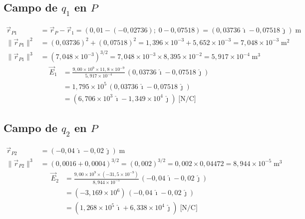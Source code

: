 \documentclass[12pt,letterpaper]{article}
\begin{document}
\subsection*{Campo de $q_1$ en $P$}

\begin{align*}
    \vec{r}_{P1} &= \vec{r}_P-\vec{r}_1
                   = (0{,}01-(-0{,}02736);\;0-0{,}07518)
                   = (0{,}03736\,\hat{\imath}-0{,}07518\,\hat{\jmath})\;\text{m}\\
    \|\vec{r}_{P1}\|^2 &= (0{,}03736)^2+(0{,}07518)^2
                         = 1{,}396\times10^{-3}+5{,}652\times10^{-3} = 7{,}048\times10^{-3}\;\text{m}^2\\
    \|\vec{r}_{P1}\|^3 &= (7{,}048\times10^{-3})^{3/2}
                         = 7{,}048\times10^{-3}\times8{,}395\times10^{-2} = 5{,}917\times10^{-4}\;\text{m}^3
\end{align*}
\begin{align*}
    \vec{E}_1
    &= \frac{9{,}00\times10^9\times11{,}8\times10^{-9}}{5{,}917\times10^{-4}}
       \,(0{,}03736\,\hat{\imath}-0{,}07518\,\hat{\jmath})\\
    &= 1{,}795\times10^5\,(0{,}03736\,\hat{\imath}-0{,}07518\,\hat{\jmath})\\
    &= (6{,}706\times10^3\,\hat{\imath}-1{,}349\times10^4\,\hat{\jmath})\;\text{[N/C]}
\end{align*}

\subsection*{Campo de $q_2$ en $P$}

\begin{align*}
    \vec{r}_{P2} &= (-0{,}04\,\hat{\imath}-0{,}02\,\hat{\jmath})\;\text{m}\\
    \|\vec{r}_{P2}\|^3 &= (0{,}0016+0{,}0004)^{3/2} = (0{,}002)^{3/2}
                         = 0{,}002\times0{,}04472 = 8{,}944\times10^{-5}\;\text{m}^3
\end{align*}
\begin{align*}
    \vec{E}_2
    &= \frac{9{,}00\times10^9\times(-31{,}5\times10^{-9})}{8{,}944\times10^{-5}}
       \,(-0{,}04\,\hat{\imath}-0{,}02\,\hat{\jmath})\\
    &= (-3{,}169\times10^6)\,(-0{,}04\,\hat{\imath}-0{,}02\,\hat{\jmath})\\
    &= (1{,}268\times10^5\,\hat{\imath}+6{,}338\times10^4\,\hat{\jmath})\;\text{[N/C]}
\end{align*}
\end{document}
